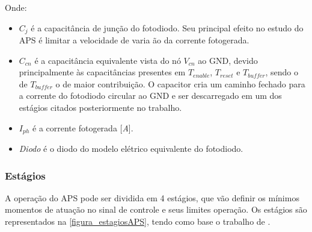 Onde: 

\begin{itemize}
    \item $C_j$ \'e a capacit\^ancia de junção do fotodiodo. Seu principal efeito no estudo do APS \'e limitar a velocidade de varia ão da corrente fotogerada.
    
    \item $C_{cn}$ \'e a capacit\^ancia equivalente vista do n\'o $V_{cn}$ ao GND, devido principalmente às capacit\^ancias presentes em $T_{enable}$,  $T_{reset}$ e $T_{buffer}$, sendo o de $T_{buffer}$ o de maior contribuição. O capacitor cria um caminho fechado para a corrente do fotodiodo circular ao GND e ser descarregado em um dos est\'agios citados posteriormente no trabalho.
    
    \item $I_{ph}$ \'e a corrente fotogerada [\textit{A}].
    
    \item \textit{Diodo} \'e o diodo do modelo el\'etrico equivalente do fotodiodo.
\end{itemize}

\subsubsection{Est\'agios}
\label{estagiosAPS}

A operação do APS pode ser dividida em 4 est\'agios, que vão definir os m\'inimos momentos de  atuação no sinal de controle e seus limites operação. Os est\'agios são representados na \autoref{figura_estagiosAPS}, tendo como base o trabalho de \cite{LidianeCampos}.

